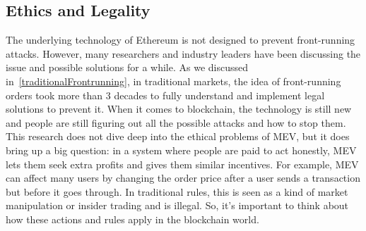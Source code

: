 \subsection{Ethics and Legality}
The underlying technology of Ethereum is not designed to prevent front-running attacks. However, many researchers and industry leaders have been discussing the issue and possible solutions for a while. As we discussed in~\ref{traditionalFrontrunning}, in traditional markets, the idea of front-running orders took more than 3 decades to fully understand and implement legal solutions to prevent it. When it comes to blockchain, the technology is still new and people are still figuring out all the possible attacks and how to stop them. This research does not dive deep into the ethical problems of MEV, but it does bring up a big question: in a system where people are paid to act honestly, MEV lets them seek extra profits and gives them similar incentives. For example, MEV can affect many users by changing the order price after a user sends a transaction but before it goes through. In traditional rules, this is seen as a kind of market manipulation or insider trading and is illegal. So, it's important to think about how these actions and rules apply in the blockchain world.